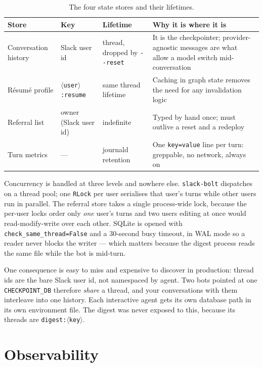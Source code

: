 \documentclass[11pt,a4paper]{article}
\newcommand{\tablefont}{\footnotesize}
\begin{document}
\begin{table}[!ht]
\centering\tablefont
\caption{The four state stores and their lifetimes.}
\label{tab:state}
\begin{tabularx}{\textwidth}{L{3.2cm} L{3.0cm} L{2.6cm} X}
\toprule
\textbf{Store} & \textbf{Key} & \textbf{Lifetime} & \textbf{Why it is where it is} \\
\midrule
Conversation history & Slack user id & thread, dropped by \texttt{-{}-reset} & It is the
  checkpointer; provider-agnostic messages are what allow a model switch mid-conversation \\
Résumé profile & \texttt{$\langle$user$\rangle$:resume} & same thread lifetime & Caching in
  graph state removes the need for any invalidation logic \\
Referral list & owner (Slack user id) & indefinite & Typed by hand once; must outlive a reset
  and a redeploy \\
Turn metrics & --- & journald retention & One \texttt{key=value} line per turn: greppable,
  no network, always on \\
\bottomrule
\end{tabularx}
\end{table}

Concurrency is handled at three levels and nowhere else. \texttt{slack-bolt} dispatches on a
thread pool; one \texttt{RLock} per user serialises that user's turns while other users run
in parallel. The referral store takes a single process-wide lock, because the per-user locks
order only \emph{one} user's turns and two users editing at once would read-modify-write over
each other. SQLite is opened with \texttt{check\_\allowbreak{}same\_\allowbreak{}thread=False} and a 30-second busy
timeout, in WAL mode so a reader never blocks the writer --- which matters because the digest
process reads the same file while the bot is mid-turn.

One consequence is easy to miss and expensive to discover in production: thread ids are the
bare Slack user id, not namespaced by agent. Two bots pointed at one
\texttt{CHECKPOINT\_\allowbreak{}DB} therefore \emph{share} a thread, and your conversations with them
interleave into one history. Each interactive agent gets its own database path in its own
environment file. The digest was never exposed to this, because its threads are
\texttt{digest:$\langle$key$\rangle$}.

\section{Observability}
\end{document}
